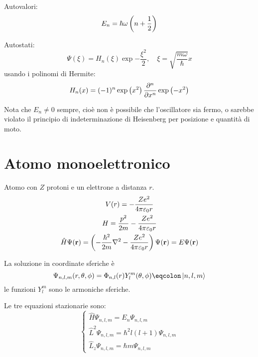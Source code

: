 Autovalori:
\begin{equation}
    E_n = \hbar \omega \left( n + \frac{1}{2} \right)
\end{equation}

Autostati:
\begin{equation}
    \Psi(\xi) = H_n(\xi) \exp{-\frac{\xi^2}{2}}, \quad
    \xi = \sqrt{\frac{m \omega}{\hbar}} x
\end{equation}
usando i polinomi di Hermite:
\begin{equation}
    H_n(x) = (-1)^n \exp{x^2} \parder[][n]{x} \exp{-x^2}
\end{equation}



Nota che $E_n \ne 0$ sempre, cioè non è possibile che l'oscillatore sia fermo, o sarebbe violato il principio di indeterminazione di Heisenberg per posizione e quantità di moto.

\section{Atomo monoelettronico}

Atomo con $Z$ protoni e un elettrone a distanza $r$.
\begin{gather}
    V(r) = -\frac{Z e^2}{4 \pi \varepsilon_0 r} \\
    H = \frac{p^2}{2 m} - \frac{Z e^2}{4 \pi \varepsilon_0 r} \\
    \hat{H} \Psi(\mathbf{r}) = \left( -\frac{\hbar^2}{2 m} \nabla^2 - \frac{Z e^2}{4 \pi \varepsilon_0 r} \right) \Psi(\mathbf{r}) = E \Psi(\mathbf{r})
\end{gather}

La soluzione in coordinate sferiche è
\begin{equation}
    \Psi_{n, l, m}(r, \theta, \phi) = \Phi_{n, l}(r) Y_l^m(\theta, \phi) \eqcolon \ket{n, l, m}
\end{equation}
le funzioni $Y_l^m$ sono le armoniche sferiche.

Le tre equazioni stazionarie sono:
\begin{equation}
    \begin{cases}
        \hat{H} \Psi_{n,l,m} = E_n \Psi_{n,l,m} \\
        \hat{L}^2 \Psi_{n,l,m} = \hbar^2 l (l + 1) \Psi_{n,l,m} \\
        \hat{L}_z \Psi_{n,l,m} = \hbar m \Psi_{n,l,m}
    \end{cases}
\end{equation}

